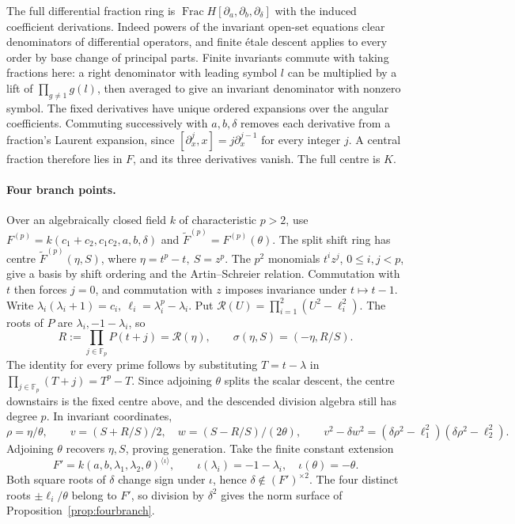 \documentclass[11pt,a4paper]{article}
\renewcommand{\le}{\leqslant}\renewcommand{\ge}{\geqslant}
\theoremstyle{definition}
\begin{document}
The full differential fraction ring is \(\operatorname{Frac}H[\partial_a,\partial_b,\partial_\delta]\) with the induced coefficient derivations. Indeed powers of the invariant open-set equations clear denominators of differential operators, and finite étale descent applies to every order by base change of principal parts. Finite invariants commute with taking fractions here: a right denominator with leading symbol \(l\) can be multiplied by a lift of \(\prod_{g\ne1}g(l)\), then averaged to give an invariant denominator with nonzero symbol. The fixed derivatives have unique ordered expansions over the angular coefficients. Commuting successively with \(a,b,\delta\) removes each derivative from a fraction's Laurent expansion, since \([\partial_x^j,x]=j\partial_x^{j-1}\) for every integer \(j\). A central fraction therefore lies in \(F\), and its three derivatives vanish. The full centre is \(K\).

\paragraph{Four branch points.}
Over an algebraically closed field \(k\) of characteristic \(p>2\), use
\(F^{(p)}=k(c_1+c_2,c_1c_2,a,b,\delta)\) and
\(\widetilde F^{(p)}=F^{(p)}(\theta)\). The split shift ring has centre
\(\widetilde F^{(p)}(\eta,S)\), where \(\eta=t^p-t,\ S=z^p\). The \(p^2\) monomials \(t^iz^j\), \(0\le i,j<p\), give a basis by shift ordering and the Artin--Schreier relation. Commutation with \(t\) then forces \(j=0\), and commutation with \(z\) imposes invariance under \(t\mapsto t-1\). Write \(\lambda_i(\lambda_i+1)=c_i,\ \ell_i=\lambda_i^p-\lambda_i\). Put \(\mathcal R(U)=\prod_{i=1}^2(U^2-\ell_i^2)\). The roots of \(P\) are \(\lambda_i,-1-\lambda_i\), so
\[
 R:=\prod_{j\in\mathbb F_p}P(t+j)=\mathcal R(\eta),
 \qquad \sigma(\eta,S)=(-\eta,R/S).
\]
The identity for every prime follows by substituting \(T=t-\lambda\) in \(\prod_{j\in\mathbb F_p}(T+j)=T^p-T\).
Since adjoining \(\theta\) splits the scalar descent, the centre downstairs is the fixed centre above, and the descended division algebra still has degree \(p\). In invariant coordinates,
\[
 \rho=\eta/\theta,\qquad v=(S+R/S)/2,\quad w=(S-R/S)/(2\theta),
 \qquad v^2-\delta w^2=(\delta\rho^2-\ell_1^2)(\delta\rho^2-\ell_2^2).
\]
Adjoining \(\theta\) recovers \(\eta,S\), proving generation. Take the finite constant extension
\[
 F'=k(a,b,\lambda_1,\lambda_2,\theta)^{\langle\iota\rangle},
 \qquad \iota(\lambda_i)=-1-\lambda_i,\quad\iota(\theta)=-\theta .
\]
Both square roots of \(\delta\) change sign under \(\iota\), hence \(\delta\notin(F')^{\times2}\). The four distinct roots \(\pm\ell_i/\theta\) belong to \(F'\), so division by \(\delta^2\) gives the norm surface of Proposition~\ref{prop:fourbranch}.
\end{document}
